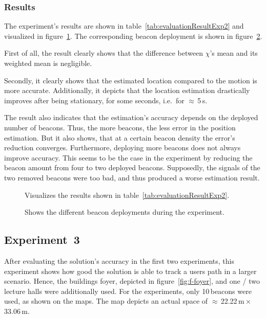 \subsubsection*{Results}
The experiment's results are shown in table~\ref{tab:evaluationResultExp2} and visualized in figure~\ref{fig:exp2_visualization}. The corresponding beacon deployment is shown in figure~\ref{fig:exp2_imgs}.

First of all, the result clearly shows that the difference between $\chi$'s mean and its weighted mean is negligible.

Secondly, it clearly shows that the estimated location compared to the motion is more accurate. Additionally, it depicts that the location estimation drastically improves after being stationary, for some seconds, i.e.\ for $\approx$\,5\,s.

The result also indicates that the estimation's accuracy depends on the deployed number of beacons. Thus, the more beacons, the less error in the position estimation. But it also shows, that at a certain beacon density the error's reduction converges. Furthermore, deploying more beacons does not always improve accuracy. This seems to be the case in the experiment by reducing the beacon amount from four to two deployed beacons. Supposedly, the signals of the two removed beacons were too bad, and thus produced a worse estimation result.

\begin{table}
	
	\caption{Depicts the results of experiment~2.}
	\label{tab:evaluationResultExp2}
\end{table}

\begin{figure}
	
	\caption{Visualizes the results shown in table~\ref{tab:evaluationResultExp2}.}
	\label{fig:exp2_visualization}
\end{figure}


\begin{figure}
	
	\caption{Shows the different beacon deployments during the experiment.}
	\label{fig:exp2_imgs}
\end{figure}


\subsection*{Experiment~3}
After evaluating the solution's accuracy in the first two experiments, this experiment shows how good the solution is able to track a users path in a larger scenario. Hence, the buildings foyer, depicted in figure~\ref{fig:f-foyer}, and one / two lecture halls were additionally used. For the experiments, only 10\,beacons were used, as shown on the maps. The map depicts an actual space of $\approx$\,22.22\,m\,$\times$\,33.06\,m.

